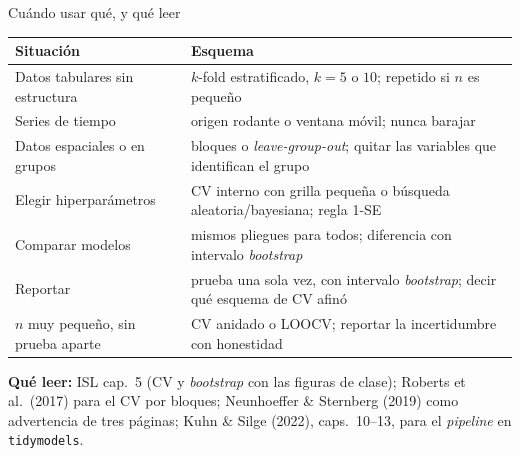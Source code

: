 \documentclass{beamer}
\newcommand{\1}{\mathbb{I}}
\begin{document}
\begin{frame}{Cuándo usar qué, y qué leer}
\small
\begin{center}
\scriptsize
\setlength{\tabcolsep}{4pt}
\renewcommand{\arraystretch}{1.2}
\begin{tabular}{lp{5.4cm}}
\hline
Situación & Esquema \\
\hline
Datos tabulares sin estructura & $k$-fold estratificado, $k = 5$ o $10$; repetido si $n$ es pequeño \\
Series de tiempo & origen rodante o ventana móvil; nunca barajar \\
Datos espaciales o en grupos & bloques o \emph{leave-group-out}; quitar las variables que identifican el grupo \\
Elegir hiperparámetros & CV interno con grilla pequeña o búsqueda aleatoria/bayesiana; regla 1-SE \\
Comparar modelos & mismos pliegues para todos; diferencia con intervalo \emph{bootstrap} \\
Reportar & prueba una sola vez, con intervalo \emph{bootstrap}; decir qué esquema de CV afinó \\
$n$ muy pequeño, sin prueba aparte & CV anidado o LOOCV; reportar la incertidumbre con honestidad \\
\hline
\end{tabular}
\end{center}
\pause
\vspace{0.1cm}
\textbf{Qué leer:} ISL cap.\ 5 (CV y \emph{bootstrap} con las figuras de clase); Roberts et al.\ (2017) para el CV por bloques; Neunhoeffer \& Sternberg (2019) como advertencia de tres páginas; Kuhn \& Silge (2022), caps.\ 10--13, para el \emph{pipeline} en \texttt{tidymodels}.
\end{frame}
\end{document}
